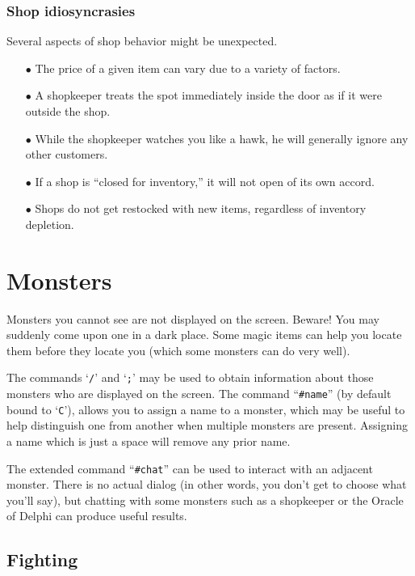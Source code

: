 \subsubsection*{Shop idiosyncrasies}

Several aspects of shop behavior might be unexpected.

\begin{itemize}
\item[$\bullet$]
The price of a given item can vary due to a variety of factors.
\item[$\bullet$]
A shopkeeper treats the spot immediately inside the door as if it were
outside the shop.
\item[$\bullet$]
While the shopkeeper watches you like a hawk, he will generally ignore
any other customers.
\item[$\bullet$]
If a shop is ``closed for inventory,'' it will not open of its own accord.
\item[$\bullet$]
Shops do not get restocked with new items, regardless of inventory depletion.
\end{itemize}

\section{Monsters}

Monsters you cannot see are not displayed on the screen.  Beware!
You may suddenly come upon one in a dark place.  Some magic items can
help you locate them before they locate you (which some monsters can do
very well).

The commands `{\tt /}' and `{\tt ;}' may be used to obtain information
about those
monsters who are displayed on the screen.  The command ``{\tt \#name}''
(by default bound to `{\tt C}'), allows you
to assign a name to a monster, which may be useful to help distinguish
one from another when multiple monsters are present.  Assigning a name
which is just a space will remove any prior name.

The extended command ``{\tt \#chat}'' can be used to interact with an adjacent
monster.  There is no actual dialog (in other words, you don't get to
choose what you'll say), but chatting with some monsters such as a
shopkeeper or the Oracle of Delphi can produce useful results.

\subsection*{Fighting}

